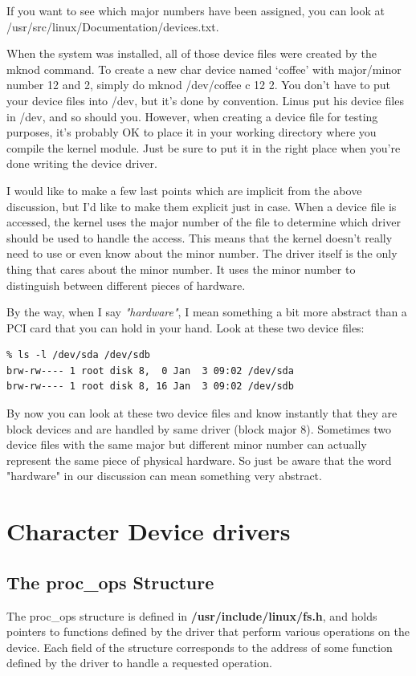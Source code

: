 \documentclass[11pt]{article}
\begin{document}
\begin{enumerate}
If you want to see which major numbers have been assigned, you can look at /usr/src/linux/Documentation/devices.txt.

When the system was installed, all of those device files were created by the mknod command. To create a new char device named `coffee' with major/minor number 12 and 2, simply do mknod /dev/coffee c 12 2. You don't have to put your device files into /dev, but it's done by convention. Linus put his device files in /dev, and so should you. However, when creating a device file for testing purposes, it's probably OK to place it in your working directory where you compile the kernel module. Just be sure to put it in the right place when you're done writing the device driver.

I would like to make a few last points which are implicit from the above discussion, but I'd like to make them explicit just in case. When a device file is accessed, the kernel uses the major number of the file to determine which driver should be used to handle the access. This means that the kernel doesn't really need to use or even know about the minor number. The driver itself is the only thing that cares about the minor number. It uses the minor number to distinguish between different pieces of hardware.

By the way, when I say \emph{"hardware"}, I mean something a bit more abstract than a PCI card that you can hold in your hand. Look at these two device files:

\begin{verbatim}
% ls -l /dev/sda /dev/sdb
brw-rw---- 1 root disk 8,  0 Jan  3 09:02 /dev/sda
brw-rw---- 1 root disk 8, 16 Jan  3 09:02 /dev/sdb
\end{verbatim}

By now you can look at these two device files and know instantly that they are block devices and are handled by same driver (block major 8). Sometimes two device files with the same major but different minor number can actually represent the same piece of physical hardware. So just be aware that the word "hardware" in our discussion can mean something very abstract.
\end{enumerate}

\section{Character Device drivers}
\label{sec:orgd3ad4b9}
\subsection{The proc\_ops Structure}
\label{sec:org3950990}
The proc\_ops structure is defined in \textbf{/usr/include/linux/fs.h}, and holds pointers to functions defined by the driver that perform various operations on the device. Each field of the structure corresponds to the address of some function defined by the driver to handle a requested operation.
\end{document}
